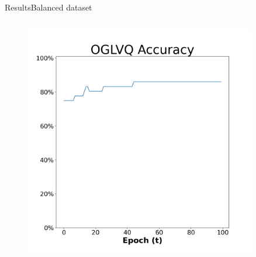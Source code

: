\documentclass[
	aspectratio=169,	%
	onlytextwidth,		%
	t,					%
	]{beamer}
\begin{document}
\begin{frame}[fragile]{Results}{Balanced dataset}
\begin{columns}
			\begin{column}[T]{0.33\textwidth}
				\begin{figure}
						\includegraphics[width=0.9\textwidth]{myfigs/OGLVQ_b_res.png}
					\end{figure}
				\end{column}
			
			
			\end{columns}
			
		\end{frame}
		
\end{document}
